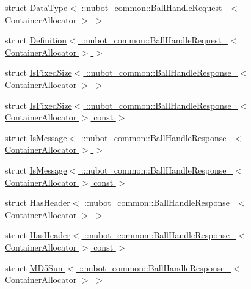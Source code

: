 \begin{DoxyCompactItemize}
\item 
struct \hyperlink{structros_1_1message__traits_1_1DataType_3_01_1_1nubot__common_1_1BallHandleRequest___3_01ContainerAllocator_01_4_01_4}{Data\-Type$<$ \-::nubot\-\_\-common\-::\-Ball\-Handle\-Request\-\_\-$<$ Container\-Allocator $>$ $>$}
\item 
struct \hyperlink{structros_1_1message__traits_1_1Definition_3_01_1_1nubot__common_1_1BallHandleRequest___3_01ContainerAllocator_01_4_01_4}{Definition$<$ \-::nubot\-\_\-common\-::\-Ball\-Handle\-Request\-\_\-$<$ Container\-Allocator $>$ $>$}
\item 
struct \hyperlink{structros_1_1message__traits_1_1IsFixedSize_3_01_1_1nubot__common_1_1BallHandleResponse___3_01ContainerAllocator_01_4_01_4}{Is\-Fixed\-Size$<$ \-::nubot\-\_\-common\-::\-Ball\-Handle\-Response\-\_\-$<$ Container\-Allocator $>$ $>$}
\item 
struct \hyperlink{structros_1_1message__traits_1_1IsFixedSize_3_01_1_1nubot__common_1_1BallHandleResponse___3_01Co2f3ba6b6e4875ec3e45297fd9bffc5d1}{Is\-Fixed\-Size$<$ \-::nubot\-\_\-common\-::\-Ball\-Handle\-Response\-\_\-$<$ Container\-Allocator $>$ const  $>$}
\item 
struct \hyperlink{structros_1_1message__traits_1_1IsMessage_3_01_1_1nubot__common_1_1BallHandleResponse___3_01ContainerAllocator_01_4_01_4}{Is\-Message$<$ \-::nubot\-\_\-common\-::\-Ball\-Handle\-Response\-\_\-$<$ Container\-Allocator $>$ $>$}
\item 
struct \hyperlink{structros_1_1message__traits_1_1IsMessage_3_01_1_1nubot__common_1_1BallHandleResponse___3_01Contd950527337dd3175b6eebfd5d394e05e}{Is\-Message$<$ \-::nubot\-\_\-common\-::\-Ball\-Handle\-Response\-\_\-$<$ Container\-Allocator $>$ const  $>$}
\item 
struct \hyperlink{structros_1_1message__traits_1_1HasHeader_3_01_1_1nubot__common_1_1BallHandleResponse___3_01ContainerAllocator_01_4_01_4}{Has\-Header$<$ \-::nubot\-\_\-common\-::\-Ball\-Handle\-Response\-\_\-$<$ Container\-Allocator $>$ $>$}
\item 
struct \hyperlink{structros_1_1message__traits_1_1HasHeader_3_01_1_1nubot__common_1_1BallHandleResponse___3_01Contf2ba5a2d1847fba09f16e3ba9c40c817}{Has\-Header$<$ \-::nubot\-\_\-common\-::\-Ball\-Handle\-Response\-\_\-$<$ Container\-Allocator $>$ const  $>$}
\item 
struct \hyperlink{structros_1_1message__traits_1_1MD5Sum_3_01_1_1nubot__common_1_1BallHandleResponse___3_01ContainerAllocator_01_4_01_4}{M\-D5\-Sum$<$ \-::nubot\-\_\-common\-::\-Ball\-Handle\-Response\-\_\-$<$ Container\-Allocator $>$ $>$}

\end{DoxyCompactItemize}
